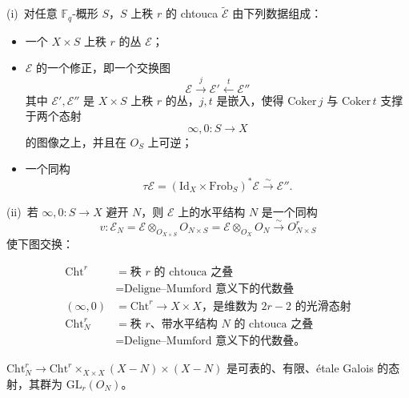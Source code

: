 \begin{definition*}[Drinfeld]
(i)\ 对任意 $\mathbb{F}_q$-概形 $S$，$S$ 上秩 $r$ 的 chtouca $\tilde{\mathcal{E}}$ 由下列数据组成：
\begin{itemize}
\item {}一个 $X \times S$ 上秩 $r$ 的丛 $\mathcal{E}$；
\item $\mathcal{E}$ 的一个修正，即一个交换图
\[ \mathcal{E} \xrightarrow{j} \mathcal{E}' \xleftarrow{t} \mathcal{E}'' \]
其中 $\mathcal{E}', \mathcal{E}''$ 是 $X \times S$ 上秩 $r$ 的丛，$j, t$ 是嵌入，使得 $\mathrm{Coker}\, j$ 与 $\mathrm{Coker}\, t$ 支撑于两个态射
\[ \infty, 0 : S \to X \]
的图像之上，并且在 $O_S$ 上可逆；
\item 一个同构
\[ \tau\mathcal{E} = (\mathrm{Id}_X \times \mathrm{Frob}_S)^*\mathcal{E} \xrightarrow{\sim} \mathcal{E}''. \]
\end{itemize}

(ii)\ 若 $\infty, 0 : S \to X$ 避开 $N$，则 $\mathcal{E}$ 上的水平结构 $N$ 是一个同构
\[ v : \mathcal{E}_N = \mathcal{E} \otimes_{O_{X\times S}} O_{N\times S} = \mathcal{E} \otimes_{O_X} O_N \xrightarrow{\sim} O^r_{N\times S} \]
使下图交换：
\begin{center}
\end{center}
\end{definition*}

\[
\begin{aligned}
\mathrm{Cht}^r &= \text{秩 $r$ 的 chtouca 之叠}\\
&= \text{Deligne--Mumford 意义下的代数叠}\\
(\infty, 0) &= \mathrm{Cht}^r \to X \times X \text{，是维数为 } 2r - 2 \text{ 的光滑态射}\\
\mathrm{Cht}^r_N &= \text{秩 $r$、带水平结构 $N$ 的 chtouca 之叠}\\
&= \text{Deligne--Mumford 意义下的代数叠。}
\end{aligned}
\]

$\mathrm{Cht}^r_N \to \mathrm{Cht}^r \times_{X\times X} (X - N) \times (X - N)$ 是可表的、有限、étale Galois 的态射，其群为 $\mathrm{GL}_r(O_N)$。

